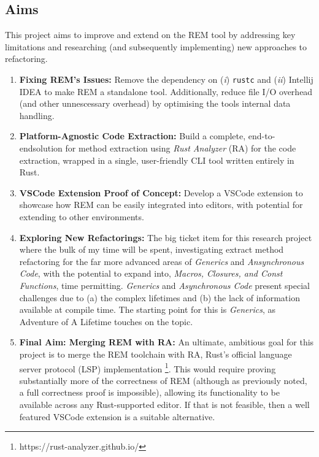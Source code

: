 \subsection*{Aims}

This project aims to improve and extend on the REM tool by addressing key
limitations and researching (and subsequently implementing) new approaches to
refactoring.
\begin{enumerate}[itemsep=0pt]
    \item \textbf{Fixing REM's Issues:} Remove the dependency on (\textit{i})
    \verb|rustc| and (\textit{ii}) Intellij IDEA to make REM a standalone tool.
    Additionally, reduce file I/O overhead (and other unnescessary overhead) by
    optimising the tools internal data handling.
    \item \textbf{Platform-Agnostic Code Extraction:} Build a complete,
    end-to-endsolution for method extraction using \textit{Rust Analyzer} (RA)
    for the code extraction, wrapped in a single, user-friendly CLI tool written
    entirely in Rust.
    \item \textbf{VSCode Extension Proof of Concept:} Develop a VSCode extension
    to showcase how REM can be easily integrated into editors, with potential
    for extending to other environments.
    \item \textbf{Exploring New Refactorings:} The big ticket item for this
    research project where the bulk of my time will be spent, investigating
    extract method refactoring for the far more advanced areas of
    \textit{Generics} and \textit{Ansynchronous Code}, with the potential to
    expand into, \textit{Macros, Closures, and Const Functions}, time
    permitting. \textit{Generics} and \textit{Asynchronous Code} present special
    challenges due to (a) the complex lifetimes and (b) the lack of information
    available at compile time. The starting point for this is \textit{Generics},
    as Adventure of A Lifetime \cite{AdventureOfALifetime} touches on the topic.
    \item \textbf{Final Aim: Merging REM with RA:} An ultimate, ambitious goal
    for this project is to merge the REM toolchain with RA, Rust's official
    language server protocol (LSP) implementation
    \footnote{https://rust-analyzer.github.io/}. This would require proving
    substantially more of the correctness of REM (although as previously noted,
    a full correctness proof is impossible), allowing its functionality to be
    available across any Rust-supported editor. If that is not feasible, then a
    well featured VSCode extension is a suitable alternative.
\end{enumerate}